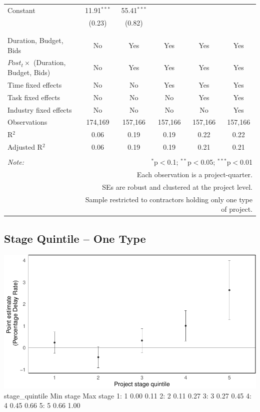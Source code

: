 \documentclass[
]{article}
\begin{document}
\begin{table}[H]
\begin{tabular}{@{\extracolsep{-2pt}}lccccc}
 Constant & 11.91$^{***}$ & 55.41$^{***}$ &  &  &  \\ 
  & (0.23) & (0.82) &  &  &  \\ 
  & & & & & \\ 
\hline \\[-1.8ex] 
Duration, Budget, Bids & No & Yes & Yes & Yes & Yes \\ 
$Post_t \times $  (Duration, Budget, Bids) & No & Yes & Yes & Yes & Yes \\ 
Time fixed effects & No & No & Yes & Yes & Yes \\ 
Task fixed effects & No & No & No & Yes & Yes \\ 
Industry fixed effects & No & No & No & No & Yes \\ 
Observations & 174,169 & 157,166 & 157,166 & 157,166 & 157,166 \\ 
R$^{2}$ & 0.06 & 0.19 & 0.19 & 0.22 & 0.22 \\ 
Adjusted R$^{2}$ & 0.06 & 0.19 & 0.19 & 0.21 & 0.21 \\ 
\hline 
\hline \\[-1.8ex] 
\textit{Note:}  & \multicolumn{5}{r}{$^{*}$p$<$0.1; $^{**}$p$<$0.05; $^{***}$p$<$0.01} \\ 
 & \multicolumn{5}{r}{Each observation is a project-quarter.} \\ 
 & \multicolumn{5}{r}{SEs are robust and clustered at the project level.} \\ 
 & \multicolumn{5}{r}{Sample restricted to contractors holding only one type of project.} \\ 
\end{tabular} 
\end{table}

\hypertarget{stage-quintile-one-type}{%
\subsection{Stage Quintile -- One Type}\label{stage-quintile-one-type}}

\includegraphics{qp_first_pc_delay-2_files/figure-latex/stage_quintile_one_type-1.pdf}
stage\_quintile Min stage Max stage 1: 1 0.00 0.11 2: 2 0.11 0.27 3: 3
0.27 0.45 4: 4 0.45 0.66 5: 5 0.66 1.00
\end{document}
